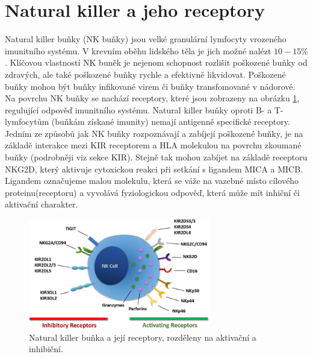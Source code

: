 \documentclass[czech,DP]{thesiskiv}
\numberwithin{equation}{section}
\begin{document}
\section{Natural killer a jeho receptory}
Natural killer buňky (NK buňky) jsou velké granulární lymfocyty vrozeného imunitního systému. V krevním oběhu lidského těla je jich možné nalézt $10-15 \%$. Klíčovou vlastností NK buněk je nejenom schopnost rozlišit poškozené buňky od zdravých, ale také poškozené buňky rychle a efektivně likvidovat. Poškozené buňky mohou být buňky infikované virem či buňky transfomované v nádorové. Na povrchu NK buňky se nachází receptory, které jsou zobrazeny na obrázku \ref{fig:NK_receptors}, regulující odpověď imunitního systému. Natural killer buňky oproti B- a T- lymfocytům (buňkám získané imunity) nemají antigenně specifické receptory. Jedním ze způsobů jak NK buňky rozpoznávají a zabíjejí poškozené buňky, je na základě interakce mezi KIR receptorem a HLA molekulou na povrchu zkoumané buňky (podrobněji viz sekce KIR). Stejně tak mohou zabíjet na základě receptoru NKG2D, který aktivuje cytoxickou reakci při setkání s ligandem MICA a MICB. Ligandem označujeme malou molekulu, která se váže na vazebné místo cílového proteinu(receptoru) a vyvolává fyziologickou odpověď, která může mít inhiční či aktivační charakter. 
\begin{figure}[H]		
		\centering
		\includegraphics[width=300px]{./img/nk_receptory.jpg}
		\caption{Natural killer buňka a její receptory, rozděleny na aktivační a inhibiční.\cite{NK_receptors} }
		\label{fig:NK_receptors}
\end{figure}
\end{document}
